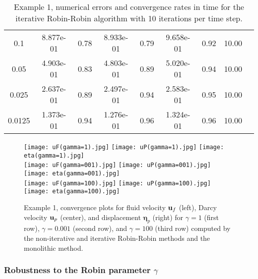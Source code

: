 \documentclass[11pt]{article}
\def\u{{\bf u}}
\def\bbeta{\boldsymbol{\eta}}
\begin{document}
\begin{table}[htb!]
\begin{tabular}{|c|c|c|c|c|c|c|c|c|}
		{\small{}0.1} & {\small{}8.877e-01    } & {\small{}0.78 } & {\small{}   8.933e-01     } & {\small{} 0.79} & {\small{}9.658e-01     } & {\small{}0.92 }  &{\small{}10.00 }\tabularnewline
		
		{\small{}0.05} & {\small{} 4.903e-01     } & {\small{}0.83 } & {\small{} 4.803e-01     } & {\small{}0.89 } & {\small{}5.020e-01       } & {\small{}0.94} &{\small{}10.00 }\tabularnewline
		
		{\small{}0.025} & {\small{} 2.637e-01   } & {\small{}0.89 } & {\small{} 2.497e-01   } & {\small{}0.94 } & {\small{}2.583e-01       } & {\small{} 0.95}  &{\small{} 10.00}\tabularnewline
		
		{\small{}0.0125} & {\small{}  1.373e-01      } & {\small{}0.94  } & {\small{} 1.276e-01      } & {\small{}0.96 } & {\small{}   1.324e-01   } & {\small{} 0.96 }  &{\small{}10.00  }\tabularnewline
		\hline
	\end{tabular}
\caption{Example 1, numerical errors and convergence rates in time 
  for the iterative Robin-Robin algorithm with 10 iterations per time step.}
 \label{tab:maxiter10}
\end{table}


\begin{figure}[ht!]
\begin{center}
\texttt{[image: uF(gamma=1).jpg]}
\texttt{[image: uP(gamma=1).jpg]}
\texttt{[image: eta(gamma=1).jpg]}\\
\texttt{[image: uF(gamma=001).jpg]}
\texttt{[image: uP(gamma=001).jpg]}
\texttt{[image: eta(gamma=001).jpg]}\\
\texttt{[image: uF(gamma=100).jpg]}
\texttt{[image: uP(gamma=100).jpg]}
\texttt{[image: eta(gamma=100).jpg]}\\
\end{center}
\caption{Example 1, convergence plots for fluid velocity $\u_f$ (left), Darcy velocity $\u_p$ (center), and displacement $\bbeta_p$ (right)
for $\gamma=1$ (first row), $\gamma=0.001$ (second row), and $\gamma=100$ (third row)
  computed by the non-iterative and iterative 
  Robin-Robin methods and the monolithic method.
}\label{fig:conv_plots}
\end{figure}

\subsubsection{Robustness to the Robin parameter $\gamma$}
\end{document}
